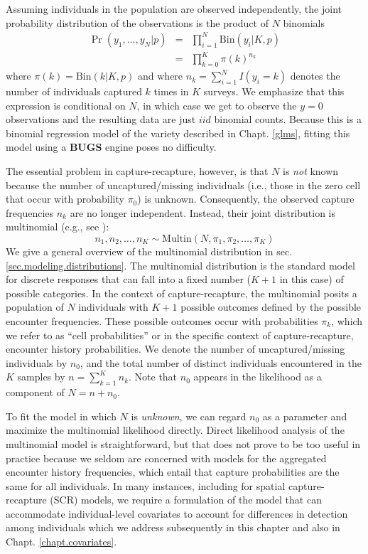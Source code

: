 Assuming individuals in the population are observed independently, the
joint probability distribution of the observations is the product of
$N$ binomials
\begin{eqnarray*}
  \Pr(y_1, \ldots, y_N | p) &=& \prod_{i=1}^N  \mathrm{Bin}(y_i | K, p) \\
   &=& \prod_{k=0}^K  \pi(k)^{n_k}
\end{eqnarray*}
where $\pi(k) = \mathrm{Bin}(k | K,p)$ and where $n_k = \sum_{i=1}^N
I(y_i = k)$ denotes the number of individuals captured $k$ times in
$K$ surveys. We emphasize that this expression is conditional on $N$, in which
case we get to observe the $y=0$ observations and the resulting data
are just $iid$ binomial counts. Because this is a binomial regression
model of the variety described in Chapt. \ref{glms}, fitting this model using
a {\bf BUGS} engine poses no difficulty.

The essential problem in capture-recapture, however, is that $N$ is
{\it not} known because the number of uncaptured/missing individuals (i.e.,
those in the zero cell that occur with probability $\pi_0$) is
unknown.  Consequently, the observed capture frequencies $n_k$ are no
longer independent. Instead, their joint distribution is multinomial
(e.g., see \citet[][p. xyz]{illian_etal:2008}):
\begin{equation}
    n_1, n_2, \ldots, n_K \sim \mathrm{Multin}(N, \pi_1, \pi_2, \ldots, \pi_K)
\label{closed.eq.multinomial4m0}
\end{equation}
We give a general overview of the multinomial distribution in
sec. \ref{sec.modeling.distributions}. The multinomial distribution is
the standard model for discrete responses that can fall into a fixed
number ($K+1$ in this case) of possible categories. In the context of
capture-recapture, the multinomial posits a population of $N$
individuals with $K+1$ possible outcomes defined by the possible
encounter frequencies. These possible outcomes occur with
probabilities $\pi_{k}$, which we refer to as ``cell probabilities''
or in the specific context of capture-recapture, encounter history
probabilities.  We denote the number of uncaptured/missing individuals
by $n_0$, and the total number of distinct individuals encountered in
the $K$ samples by $n = \sum_{k=1}^K n_k$.  Note that $n_{0}$ appears
in the likelihood as a component of $N = n + n_{0}$.


To fit the model in which $N$ is {\it unknown}, we can regard $n_{0}$ as a
parameter and maximize the multinomial likelihood directly.  
Direct likelihood analysis of the multinomial model is
straightforward, but that does not prove to be too useful in practice
because we seldom are concerned with models for the aggregated
encounter history frequencies, which entail that capture probabilities are the 
same for all individuals. In many instances, including for
spatial capture-recapture (SCR) models, we require a formulation of
the model that can accommodate individual-level 
covariates to account for 
differences in detection among individuals which we
address subsequently in this chapter and also in Chapt. \ref{chapt.covariates}.



